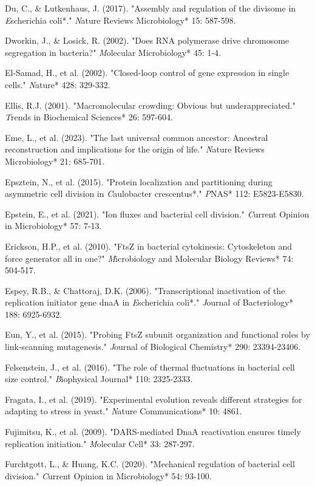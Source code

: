\documentclass[11pt,a4paper]{article}
\begin{document}
Du, C., & Lutkenhaus, J. (2017). "Assembly and regulation of the divisome in \textit*Escherichia coli*." \textit*Nature Reviews Microbiology* 15: 587-598.

Dworkin, J., & Losick, R. (2002). "Does RNA polymerase drive chromosome segregation in bacteria?" \textit*Molecular Microbiology* 45: 1-4.

El-Samad, H., et al. (2002). "Closed-loop control of gene expression in single cells." \textit*Nature* 428: 329-332.

Ellis, R.J. (2001). "Macromolecular crowding: Obvious but underappreciated." \textit*Trends in Biochemical Sciences* 26: 597-604.

Eme, L., et al. (2023). "The last universal common ancestor: Ancestral reconstruction and implications for the origin of life." \textit*Nature Reviews Microbiology* 21: 685-701.

Epsztein, N., et al. (2015). "Protein localization and partitioning during asymmetric cell division in \textit*Caulobacter crescentus*." \textit*PNAS* 112: E5823-E5830.

Epstein, E., et al. (2021). "Ion fluxes and bacterial cell division." \textit*Current Opinion in Microbiology* 57: 7-13.

Erickson, H.P., et al. (2010). "FtsZ in bacterial cytokinesis: Cytoskeleton and force generator all in one?" \textit*Microbiology and Molecular Biology Reviews* 74: 504-517.

Espey, R.B., & Chattoraj, D.K. (2006). "Transcriptional inactivation of the replication initiator gene dnaA in \textit*Escherichia coli*." \textit*Journal of Bacteriology* 188: 6925-6932.

Eun, Y., et al. (2015). "Probing FtsZ subunit organization and functional roles by link-scanning mutagenesis." \textit*Journal of Biological Chemistry* 290: 23394-23406.

Felsenstein, J., et al. (2016). "The role of thermal fluctuations in bacterial cell size control." \textit*Biophysical Journal* 110: 2325-2333.

Fragata, I., et al. (2019). "Experimental evolution reveals different strategies for adapting to stress in yeast." \textit*Nature Communications* 10: 4861.

Fujimitsu, K., et al. (2009). "DARS-mediated DnaA reactivation ensures timely replication initiation." \textit*Molecular Cell* 33: 287-297.

Furchtgott, L., & Huang, K.C. (2020). "Mechanical regulation of bacterial cell division." \textit*Current Opinion in Microbiology* 54: 93-100.
\end{document}
